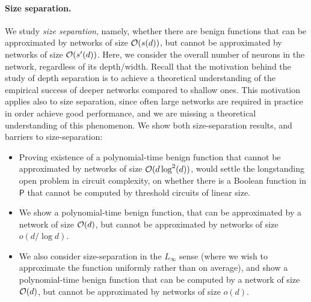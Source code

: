 \documentclass[11pt]{article}
\newcommand{\co}{{\cal O}}
\newcommand{\Ptime}{\textsf{P}}
\begin{document}
\paragraph{Size separation.}
We study {\em size separation}, namely, whether there are benign functions that can be approximated by networks of size $\co(s(d))$, but cannot be approximated by networks of size $\co(s'(d))$. Here, we consider the overall number of neurons in the network, regardless of its depth/width.
Recall that the motivation behind the study of depth separation is to achieve a theoretical understanding of the empirical success of deeper networks compared to shallow ones. This motivation applies also to size separation, since often large networks are required in practice in order achieve good performance, and we are missing a theoretical understanding of this phenomenon. We show both size-separation results, and barriers to size-separation:
\begin{itemize}
	\item Proving existence of a polynomial-time benign function that cannot be approximated by networks of size $\co(d \log^2(d))$, would settle the longstanding open problem in circuit complexity, on whether there is a Boolean function in $\Ptime$ that cannot be computed by threshold circuits of linear size.
	
	\item We show a polynomial-time benign function, that can be approximated by a network of size $\co(d)$, but cannot be approximated by networks of size $o(d/\log d)$. 
	
	\item We also consider size-separation in the $L_\infty$ sense (where we wish to approximate the function uniformly rather than on average), and show a polynomial-time benign function that can be computed by a network of size $\co(d)$, but cannot be approximated by networks of size $o(d)$.  
\end{itemize}
\end{document}
